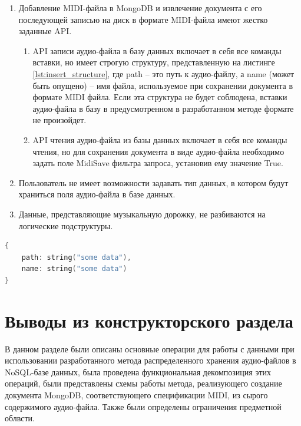 \begin{enumerate}
\item Добавление MIDI-файла в MongoDB и извлечение документа с его последующей записью на диск в формате MIDI-файла имеют жестко заданные API.
\begin{enumerate}
\item API записи аудио-файла в базу данных включает в себя все команды вставки, но имеет строгую структуру, представленную на листинге \ref{lst:insert_structure}, где path -- это путь к аудио-файлу, а name (может быть опущено) -- имя файла, используемое при сохранении документа в формате MIDI файла. Если эта структура не будет соблюдена, вставки аудио-файла в базу в предусмотренном в разработанном методе формате не произойдет.
\item API чтения аудио-файла из базы данных включает в себя все команды чтения, но для сохранения документа в виде аудио-файла необходимо задать поле MidiSave фильтра запроса, установив ему значение True.
\end{enumerate}
\item Пользователь не имеет возможности задавать тип данных, в котором будут храниться поля аудио-файла в базе данных.
\item Данные, представляющие музыкальную дорожку, не разбиваются на логические подструктуры.
\end{enumerate}

\begin{lstlisting}[language=C, label=some-code, caption=Структура запроса на добавление аудио-файла в MongoDB, label=lst:insert_structure]
{ 
    path: string("some data"),
    name: string("some data")
}
\end{lstlisting}

\section{Выводы из конструкторского раздела}

В данном разделе были описаны основные операции для работы с данными при использовании разработанного метода распределенного хранения аудио-файлов в NoSQL-базе данных, была проведена функциональная декомпозиция этих операций, были представлены схемы работы метода, реализующего создание документа MongoDB, соответствующего спецификации MIDI, из сырого содержимого аудио-файла. Также были определены ограничения предметной облвсти.

